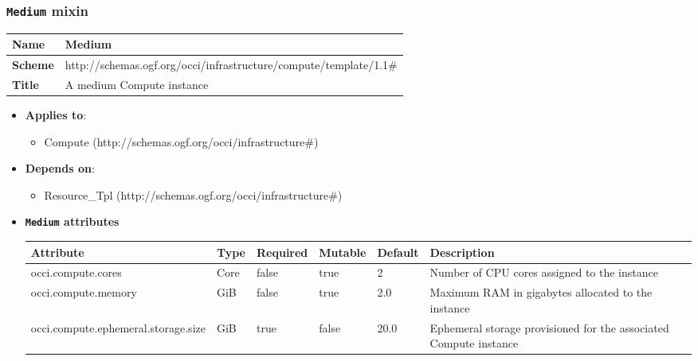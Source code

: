  
\subsubsection{\texttt{Medium} mixin}
\begin{center}
\begin{tabular}{|l|l|}
  \hline
  \textbf{Name} & Medium \\
  \hline  
  \textbf{Scheme} & http://schemas.ogf.org/occi/infrastructure/compute/template/1.1\# \\
  \hline
  \textbf{Title} & A medium Compute instance \\
  \hline
\end{tabular}
\end{center}
\begin{itemize}
\item \textbf{Applies to}:
\begin{itemize}
	\item Compute (http://schemas.ogf.org/occi/infrastructure\#)
\end{itemize}
\end{itemize} 
\begin{itemize}
\item \textbf{Depends on}:
\begin{itemize}
	\item Resource\_Tpl (http://schemas.ogf.org/occi/infrastructure\#)
\end{itemize}
\end{itemize}

\begin{itemize}
\item \textbf{\texttt{Medium} attributes}

\begin{tabularx}{\textwidth}{|l|l|p{1.4cm}|p{1.3cm}|l|X|}
  \hline
  \textbf{Attribute} & \textbf{Type} & \textbf{Required} & \textbf{Mutable} & \textbf{Default} & \textbf{Description} \\
  \hline  
  occi.compute.cores & Core & false & true & 2 & Number of CPU cores assigned to the instance \\
  \hline
  occi.compute.memory & GiB & false & true & 2.0 & Maximum RAM in gigabytes allocated to the instance \\
  \hline
  occi.compute.ephemeral.storage.size & GiB & true & false & 20.0 & Ephemeral storage provisioned for the associated Compute instance \\
  \hline
\end{tabularx}
\end{itemize}


